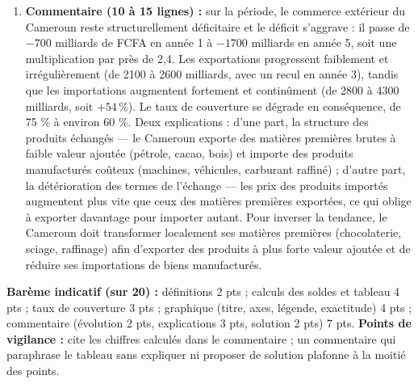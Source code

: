 \documentclass[11pt]{article}
\begin{document}
\begin{corrige}
\begin{enumerate}
\item \textbf{Commentaire (10 à 15 lignes) :} sur la période, le commerce extérieur du Cameroun reste structurellement déficitaire et le déficit s'aggrave : il passe de $-700$ milliards de FCFA en année 1 à $-\num{1700}$ milliards en année 5, soit une multiplication par près de 2,4. Les exportations progressent faiblement et irrégulièrement (de \num{2100} à \num{2600} milliards, avec un recul en année 3), tandis que les importations augmentent fortement et continûment (de \num{2800} à \num{4300} milliards, soit $+54\,\%$). Le taux de couverture se dégrade en conséquence, de 75 \% à environ 60 \%. Deux explications : d'une part, la structure des produits échangés — le Cameroun exporte des matières premières brutes à faible valeur ajoutée (pétrole, cacao, bois) et importe des produits manufacturés coûteux (machines, véhicules, carburant raffiné) ; d'autre part, la détérioration des termes de l'échange — les prix des produits importés augmentent plus vite que ceux des matières premières exportées, ce qui oblige à exporter davantage pour importer autant. Pour inverser la tendance, le Cameroun doit transformer localement ses matières premières (chocolaterie, sciage, raffinage) afin d'exporter des produits à plus forte valeur ajoutée et de réduire ses importations de biens manufacturés.
\end{enumerate}
\textbf{Barème indicatif (sur 20) :} définitions 2 pts ; calculs des soldes et tableau 4 pts ; taux de couverture 3 pts ; graphique (titre, axes, légende, exactitude) 4 pts ; commentaire (évolution 2 pts, explications 3 pts, solution 2 pts) 7 pts.
\textbf{Points de vigilance :} cite les chiffres calculés dans le commentaire ; un commentaire qui paraphrase le tableau sans expliquer ni proposer de solution plafonne à la moitié des points.
\end{corrige}
\end{document}
